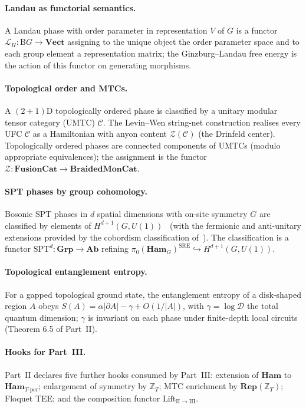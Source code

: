 \documentclass[12pt]{article}
\theoremstyle{definition}
\theoremstyle{remark}
\newcommand{\Vect}{\mathbf{Vect}}
\newcommand{\Ham}{\mathbf{Ham}}
\newcommand{\Rep}{\mathbf{Rep}}
\newcommand{\BG}{\mathrm{B}G}
\newcommand{\Z}{\mathbb{Z}}
\begin{document}
\paragraph{Landau as functorial semantics.} A Landau phase with order
parameter in representation $V$ of $G$ is a functor $\mathcal{L}_H : \BG \to
\Vect$ assigning to the unique object the order parameter space and to each
group element a representation matrix; the Ginzburg--Landau free energy is
the action of this functor on generating morphisms.

\paragraph{Topological order and MTCs.} A $(2{+}1)$D topologically ordered
phase is classified by a unitary modular tensor category (UMTC) $\mathcal{C}$.
The Levin--Wen string-net construction realises every UFC $\mathcal{C}$ as a
Hamiltonian with anyon content $\mathcal{Z}(\mathcal{C})$ (the Drinfeld
center). Topologically ordered phases are connected components of UMTCs (modulo
appropriate equivalences); the assignment is the functor
$\mathcal{Z} : \mathbf{FusionCat} \to \mathbf{BraidedMonCat}$.

\paragraph{SPT phases by group cohomology.} Bosonic SPT phases in $d$ spatial
dimensions with on-site symmetry $G$ are classified by elements of
$H^{d+1}(G, U(1))$~\cite{chen2013} (with the fermionic and anti-unitary
extensions provided by the cobordism classification
of~\cite{freedhopkins2021}). The classification is a functor
$\mathrm{SPT}^d : \mathbf{Grp} \to \mathbf{Ab}$ refining
$\pi_0(\Ham_G)^{\mathrm{SRE}} \hookrightarrow H^{d+1}(G, U(1))$.

\paragraph{Topological entanglement entropy.} For a gapped topological ground
state, the entanglement entropy of a disk-shaped region $A$ obeys $S(A) =
\alpha |\partial A| - \gamma + O(1/|A|)$, with $\gamma = \log \mathcal{D}$ the
total quantum dimension; $\gamma$ is invariant on each phase under
finite-depth local circuits (Theorem 6.5 of Part~II).

\paragraph{Hooks for Part~III.} Part~II declares five further hooks consumed
by Part~III: extension of $\Ham$ to $\Ham_{T\text{-per}}$; enlargement of
symmetry by $\Z_T$; MTC enrichment by $\Rep(\Z_T)$; Floquet TEE; and the
composition functor $\mathrm{Lift}_{\mathrm{II}\to\mathrm{III}}$.
\end{document}
